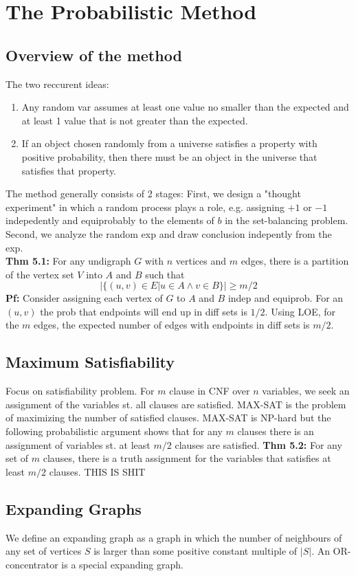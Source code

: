 \documentclass[a4paper]{article}
\begin{document}
\section{The Probabilistic Method}
\subsection{Overview of the method}
\label{sub:Overview of the method}
The two reccurent ideas:
\begin{enumerate}
  \item Any random var assumes at least one value no smaller than the expected and at least 1 value that is not greater than the expected.
  \item If an object chosen randomly from a universe satisfies a property with positive probability, then there must be an object in the universe that satisfies that property.
\end{enumerate}
The method generally consists of 2 stages: First, we design a "thought experiment" in which a random process plays a role, e.g. assigning $+1$ or $-1$ indepedently and equiprobably to the elements of $b$ in the set-balancing problem. Second, we analyze the random exp and draw conclusion indepently from the exp.\\

\textbf{Thm 5.1: } For any undigraph $G$ with $n$ vertices and $m$ edges, there is a partition of the vertex set $V$ into $A$ and $B$ such that
$$
  |\{(u,v)\in E | u\in A \land v \in B\}|\geq m/2
$$\textbf{Pf: } Consider assigning each vertex of $G$ to $A$ and $B$ indep and equiprob. For an $(u,v)$ the prob that endpoints will end up in diff sets is $1/2$. Using LOE, for the $m$ edges, the expected number of edges with endpoints in diff sets is $m/2$.\\

\subsection{Maximum Satisfiability}
\label{sub:Maximum Satisfiability}
Focus on satisfiability problem. For $m$ clause in CNF over $n$ variables, we seek an assignment of the variables st. all clauses are satisfied. MAX-SAT is the problem of maximizing the number of satisfied clauses. MAX-SAT is NP-hard but the following probabilistic argument shows that for any $m$ clauses there is an assignment of variables st. at least $m/2$ clauses are satisfied.
\textbf{Thm 5.2: } For any set of $m$ clauses, there is a truth assignment for the variables that satisfies at least $m/2$ clauses.
THIS IS SHIT
\subsection{Expanding Graphs}
\label{sub:Expanding Graphs}
We define an expanding graph as a graph in which the number of neighbours of any set of vertices $S$ is larger than some positive constant multiple of $|S|$. An OR-concentrator is a special expanding graph.
\end{document}
